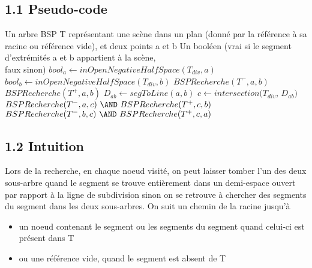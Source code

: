 \documentclass[a4paper,12pt]{report}	%
\begin{document}
	{\subsection*{1.1 Pseudo-code}}
	
	\begin{algorithm}
	\caption{$BSPRecherche(T, a, b)$}
	\label{Modele pour un algo}
	\begin{algorithmic} [1]
	\REQUIRE Un arbre BSP T représentant une scène dans un plan (donné par la référence à sa 							racine ou référence vide),  et deux points a et b
	\ENSURE Un booléen (vrai si le segment d'extrémités a et b appartient à la scène,  \\faux sinon)
	\RETURN \FALSE
	\ELSE
	\RETURN \TRUE
	\ELSE 
	\STATE $bool_a \gets inOpenNegativeHalfSpace(T_{div},a)$
	\STATE $bool_b \gets inOpenNegativeHalfSpace(T_{div},b)$
	\RETURN $BSPRecherche(T^{-}, a, b)$
	\ELSE
	\RETURN $BSPRecherche(T^{+}, a, b)$
	\ELSE
	\STATE $D_{ab} \gets segToLine(a, b)$
	\STATE $c \gets intersection(T_{div}$, $D_{ab})$
	\RETURN $BSPRecherche(T^{-}, a, c)\ \AND\ BSPRecherche(T^{+}, c, b)$
	\ELSE
	\RETURN $BSPRecherche(T^{-}, b, c)\ \AND\ BSPRecherche(T^{+}, c, a)$
	\ENDIF
	\ENDIF
	\ENDIF
	\ENDIF
	\ENDIF
	\end{algorithmic}
	\end{algorithm}
	
	\newpage
	{\subsection*{1.2 Intuition}}
	
	\noindent Lors de la recherche, en chaque noeud visité, on peut laisser tomber l'un des deux sous-arbre quand le segment se trouve entièrement dans un demi-espace ouvert par rapport à la ligne de subdivision sinon on se retrouve à chercher des segments du segment dans les deux sous-arbres. On suit un chemin de la racine jusqu'à
\begin{itemize}
\item un noeud contenant le segment ou les segments du segment quand celui-ci est présent dans T 
\item ou  une référence vide, quand le segment est absent de T
\end{itemize}
\end{document}
